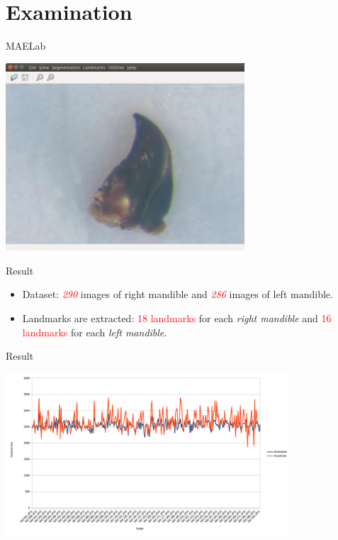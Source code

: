 \documentclass{beamer}
\begin{document}
\section{Examination}
\begin{frame}{MAELab}
	\begin{center}
		\includegraphics[height=7cm]{images/software}
	\end{center}
\end{frame}
\begin{frame}{Result}		
	\begin{itemize}
		\item Dataset: \textit{\textcolor{red}{290}} images of right mandible and \textit{\textcolor{red}{286}} images of left mandible.
		\item Landmarks are extracted: \textcolor{red}{18 landmarks} for each \textit{right mandible} and \textcolor{red}{16 landmarks} for each \textit{left mandible}.
	\end{itemize}
\end{frame}
\begin{frame}{Result}
	\begin{center}
		\includegraphics[height=6cm]{images/MdChart.png}	
	\end{center}
\end{frame}
\end{document}
